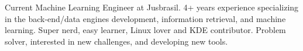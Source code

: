 

\begin{cvparagraph}

Current Machine Learning Engineer at Jusbrasil. 4+ years experience specializing in the back-end/data engines development, information retrieval, and machine learning. Super nerd, easy learner, Linux lover and KDE contributor. Problem solver, interested in new challenges, and developing new tools.
\end{cvparagraph}
